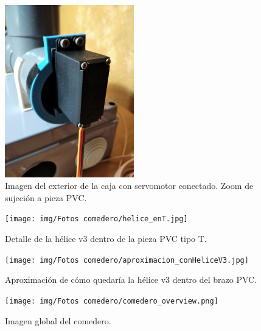 \documentclass[12pt]{article}
\begin{document}
	\pagebreak

	\begin{figure}[h!]
		\begin{center}
			\includegraphics[width=0.5\textwidth]{img/Fotos comedero/servo_sujecion_zoom.jpg}
			\caption{Imagen del exterior de la caja con servomotor conectado. Zoom de sujeción a pieza PVC.}
			\label{Prototipo: sujecion exterior servo (zoom)}
		\end{center}
	\end{figure}

	\pagebreak

	\begin{figure}[h!]
		\begin{center}
			\texttt{[image: img/Fotos comedero/helice\_enT.jpg]}
			\caption{Detalle de la hélice v3 dentro de la pieza PVC tipo T.}
			\label{Prototipo: helice v3 dentro de pieza PVC tipo T.}
		\end{center}
	\end{figure}	
	
	\pagebreak

	\begin{figure}[h!]
		\begin{center}
			\texttt{[image: img/Fotos comedero/aproximacion\_conHeliceV3.jpg]}
			\caption{Aproximación de cómo quedaría la hélice v3 dentro del brazo PVC.}
			\label{Prototipo: helice v3 dentro de brazo PVC (aproximación)}
		\end{center}
	\end{figure}	

	\pagebreak
	
	\begin{figure}[h!]
		\begin{center}
			\texttt{[image: img/Fotos comedero/comedero\_overview.png]}
			\caption{Imagen global del comedero.}
			\label{Prototipo: comedero overview}
		\end{center}
	\end{figure}
\end{document}
